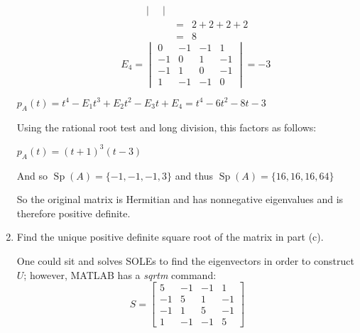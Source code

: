 \documentclass[letterpaper,12pt,fleqn]{article}
\DeclareMathOperator{\Sp}{Sp}
\begin{document}
\begin{enumerate}
\begin{enumerate}
\begin{eqnarray*}
\begin{vmatrix}
      \end{vmatrix} \\
      &=& 2+2+2+2 \\
      &=& 8
    \end{eqnarray*}
    \[E_4=\begin{vmatrix}
    0 & -1 & -1 & 1 \\
    -1 & 0 & 1 & -1 \\
    -1 & 1 & 0 & -1 \\
    1 & -1 & -1 & 0
    \end{vmatrix}=-3\]
  \end{enumerate}
  $p_A(t)=t^4-E_1t^3+E_2t^2-E_3t+E_4=t^4-6t^2-8t-3$

  Using the rational root test and long division, this factors as follows:

  $p_A(t)=(t+1)^3(t-3)$

  And so $\Sp(A)=\{-1,-1,-1,3\}$ and thus $\Sp(A)=\{16,16,16,64\}$

  So the original matrix is Hermitian and has nonnegative eigenvalues and is
  therefore positive definite.

\item Find the unique positive definite square root of the matrix in
  part (c).

  One could sit and solves SOLEs to find the eigenvectors in order to
  construct $U$; however, MATLAB has a \emph{sqrtm} command:
  \[S=\begin{bmatrix}
  5 & -1 & -1 & 1 \\
  -1 & 5 & 1 & -1 \\
  -1 & 1 & 5 & -1 \\
  1 & -1 & -1 & 5
  \end{bmatrix}\]
\end{enumerate}
\end{document}
